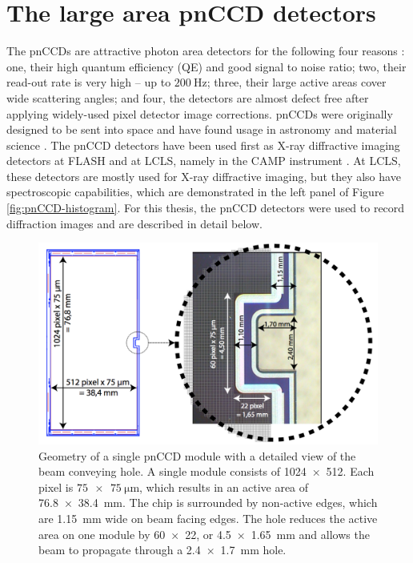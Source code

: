 \section{The large area pnCCD detectors}\label{sec:pnCCD}
The pnCCDs are attractive photon area detectors for the following four reasons \cite{Hartmann-2006-NIMA,Ordavo-2011-NIMA}: one, their high quantum efficiency (QE) and good signal to noise ratio; two, their read-out rate is very high -- up to $\SI{200}{\hertz}$; three, their large active areas cover wide scattering angles; and four, the detectors are almost defect free after applying widely-used pixel detector image corrections. pnCCDs were originally designed to be sent into space and have found usage in astronomy and material science \cite{Struder-2001-AA}. The pnCCD detectors have been used first as X-ray diffractive imaging detectors at FLASH and at LCLS, namely in the CAMP instrument \cite{Strueder-2010-NIMPA}. At LCLS, these detectors are mostly used for X-ray diffractive imaging, but they also have spectroscopic capabilities, which are demonstrated in the left panel of Figure \ref{fig:pnCCD-histogram}. For this thesis, the pnCCD detectors were used to record diffraction images and are described in detail below.\\[1\baselineskip]
%
\begin{figure}
	\centering
   \includegraphics[width=0.7\linewidth]{images/pnCCD-detail.png}
    \caption[Geometry of a single pnCCD module.]{Geometry of a single pnCCD module with a detailed view of the beam conveying hole. A single module consists of \SI{1024 x 512}{\pixels}. Each pixel is $\SI{75 x 75}{\micro\meter}$, which results in an active area of \SI{76.8 x 38.4}{\milli\meter}. The chip is surrounded by non-active edges, which are \SI{1.15}{\milli\meter} wide on beam facing edges. The hole reduces the active area on one module by \SI{60 x 22}{\pixels}, or \SI{4.5 x 1.65}{\milli\meter} and allows the beam to propagate through a \SI{2.4 x 1.7}{\milli\meter} hole.}
\label{fig:ccd-detail}
\end{figure}
